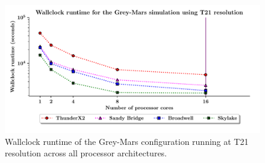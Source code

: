 \documentclass[a4paper,11pt]{report}
\begin{document}
\begin{figure}[htbp]
\begin{center}
\includegraphics[width=1\linewidth]{img/scaling_graph_T21_Grey_mars.pdf}
\caption[Wallclock runtime of the Grey-Mars configuration at T21 resolution]{Wallclock runtime of the Grey-Mars configuration running at T21 resolution across all processor architectures.}
\label{fig:t21-scale-grey}
\end{center}
\end{figure}
\newpage
\end{document}
